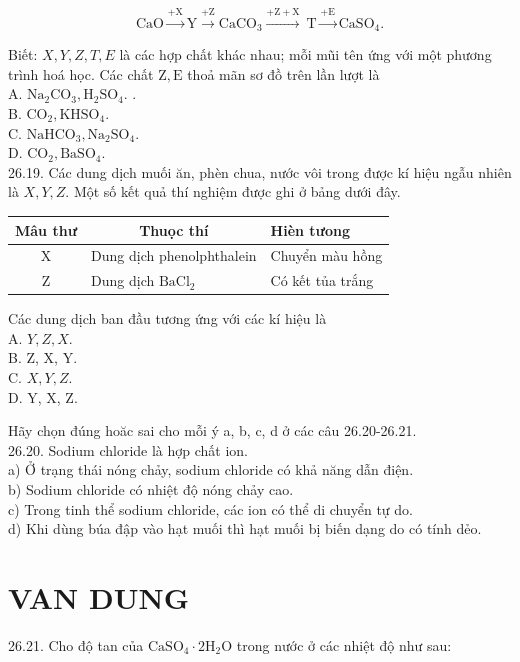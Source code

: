 \documentclass[10pt]{article}
\begin{document}
$$
\mathrm{CaO} \xrightarrow{+\mathrm{X}} \mathrm{Y} \xrightarrow{+\mathrm{Z}} \mathrm{CaCO}_{3} \xrightarrow{+\mathrm{Z}+\mathrm{X}} \mathrm{~T} \xrightarrow{+\mathrm{E}} \mathrm{CaSO}_{4} .
$$

Biết: $X, Y, Z, T, E$ là các hợp chất khác nhau; mỗi mũi tên ứng với một phương trình hoá học. Các chất $\mathrm{Z}, \mathrm{E}$ thoả mãn sơ đồ trên lần lượt là\\
A. $\mathrm{Na}_{2} \mathrm{CO}_{3}, \mathrm{H}_{2} \mathrm{SO}_{4}$. .\\
B. $\mathrm{CO}_{2}, \mathrm{KHSO}_{4}$.\\
C. $\mathrm{NaHCO}_{3}, \mathrm{Na}_{2} \mathrm{SO}_{4}$.\\
D. $\mathrm{CO}_{2}, \mathrm{BaSO}_{4}$.\\
26.19. Các dung dịch muối ăn, phèn chua, nước vôi trong được kí hiệu ngẫu nhiên là $X, Y, Z$. Một số kết quả thí nghiệm được ghi ở bảng dưới đây.

\begin{center}
\begin{tabular}{|c|l|l|}
\hline
Mâu thư & \multicolumn{1}{|c|}{Thuọc thí} & Hièn tưong \\
\hline
X & Dung dịch phenolphthalein & Chuyển màu hồng \\
\hline
Z & Dung dịch $\mathrm{BaCl}_{2}$ & Có kết tủa trắng \\
\hline
\end{tabular}
\end{center}

Các dung dịch ban đầu tương ứng với các kí hiệu là\\
A. $Y, Z, X$.\\
B. Z, X, Y.\\
C. $X, Y, Z$.\\
D. Y, X, Z.

Hãy chọn đúng hoăc sai cho mỗi ý a, b, c, d ở các câu 26.20-26.21.\\
26.20. Sodium chloride là hợp chất ion.\\
a) Ở trạng thái nóng chảy, sodium chloride có khả năng dẫn điện.\\
b) Sodium chloride có nhiệt độ nóng chảy cao.\\
c) Trong tinh thể sodium chloride, các ion có thể di chuyển tự do.\\
d) Khi dùng búa đập vào hạt muối thì hạt muối bị biến dạng do có tính dẻo.

\section*{VAN DUNG}
26.21. Cho độ tan của $\mathrm{CaSO}_{4} \cdot 2 \mathrm{H}_{2} \mathrm{O}$ trong nước ở các nhiệt độ như sau:
\end{document}
